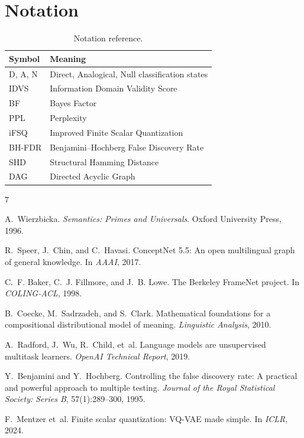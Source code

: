 \documentclass[11pt, a4paper]{article}
\begin{document}
\appendix
\section{Notation}

\begin{table}[ht]
\centering
\small
\begin{tabular}{ll}
\toprule
\textbf{Symbol} & \textbf{Meaning} \\
\midrule
D, A, N & Direct, Analogical, Null classification states \\
IDVS    & Information Domain Validity Score \\
BF      & Bayes Factor \\
PPL     & Perplexity \\
iFSQ    & Improved Finite Scalar Quantization \\
BH-FDR  & Benjamini--Hochberg False Discovery Rate \\
SHD     & Structural Hamming Distance \\
DAG     & Directed Acyclic Graph \\
\bottomrule
\end{tabular}
\caption{Notation reference.}
\label{tab:notation}
\end{table}



\begin{thebibliography}{7}

A.~Wierzbicka.
\newblock \emph{Semantics: Primes and Universals}.
\newblock Oxford University Press, 1996.

R.~Speer, J.~Chin, and C.~Havasi.
\newblock ConceptNet 5.5: An open multilingual graph of general knowledge.
\newblock In \emph{AAAI}, 2017.

C.~F. Baker, C.~J. Fillmore, and J.~B. Lowe.
\newblock The Berkeley FrameNet project.
\newblock In \emph{COLING-ACL}, 1998.

B.~Coecke, M.~Sadrzadeh, and S.~Clark.
\newblock Mathematical foundations for a compositional distributional model of meaning.
\newblock \emph{Linguistic Analysis}, 2010.

A.~Radford, J.~Wu, R.~Child, et~al.
\newblock Language models are unsupervised multitask learners.
\newblock \emph{OpenAI Technical Report}, 2019.

Y.~Benjamini and Y.~Hochberg.
\newblock Controlling the false discovery rate: A practical and powerful approach to multiple testing.
\newblock \emph{Journal of the Royal Statistical Society: Series B}, 57(1):289--300, 1995.

F.~Mentzer et~al.
\newblock Finite scalar quantization: {VQ-VAE} made simple.
\newblock In \emph{ICLR}, 2024.

\end{thebibliography}
\end{document}
